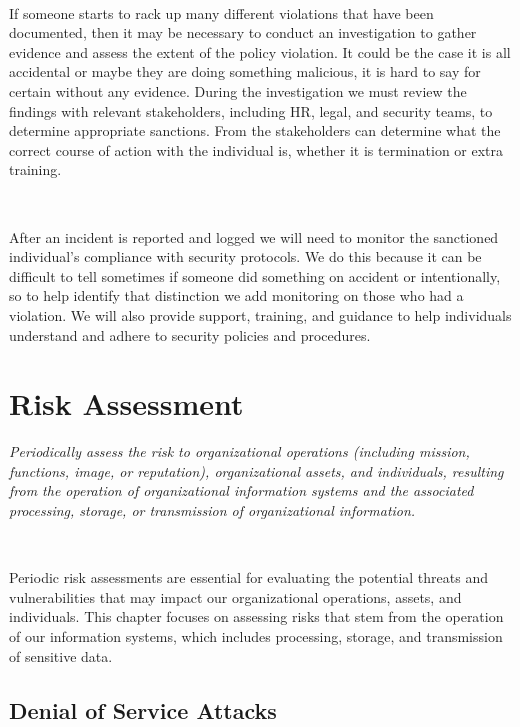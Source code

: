 \documentclass[12pt,a4paper]{report}
\begin{document}
\

If someone starts to rack up many different violations that have been documented, then it may be necessary to conduct an investigation to gather evidence and assess the extent of the policy violation.
It could be the case it is all accidental or maybe they are doing something malicious, it is hard to say for certain without any evidence.
During the investigation we must review the findings with relevant stakeholders, including HR, legal, and security teams, to determine appropriate sanctions.
From the stakeholders can determine what the correct course of action with the individual is, whether it is termination or extra training.

\

After an incident is reported and logged we will need to monitor the sanctioned individual's compliance with security protocols.
We do this because it can be difficult to tell sometimes if someone did something on accident or intentionally, so to help identify that distinction we add monitoring on those who had a violation.
We will also provide support, training, and guidance to help individuals understand and adhere to security policies and procedures.

\chapter{Risk Assessment}
\textit{Periodically assess the risk to organizational operations 
(including mission, functions, image, or reputation), organizational assets, and 
individuals, resulting from the operation of organizational information systems and 
the associated processing, storage, or transmission of organizational information.}

\

Periodic risk assessments are essential for evaluating the potential threats and vulnerabilities that may impact our organizational operations, assets, and individuals. 
This chapter focuses on assessing risks that stem from the operation of our information systems, which includes processing, storage, and transmission of sensitive data.

\section{Denial of Service Attacks}
\
\end{document}
